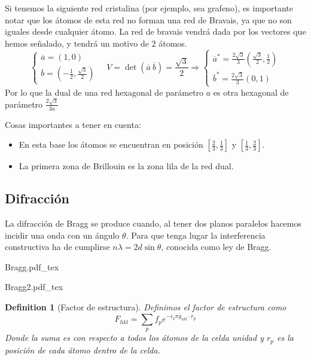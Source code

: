 \documentclass[leqno]{article}
\newtheorem*{definition}{Definition}
\newcommand{\incfig}[1]{%
\center
\def\svgwidth{0.9\columnwidth}
{#1.pdf_tex}
}
\begin{document}
Si tenemos la siguiente red cristalina (por ejemplo, sea grafeno), es importante notar que los átomos de esta red no forman una red de Bravais, ya que no son iguales desde cualquier átomo. La red de bravais vendrá dada por los vectores que hemos señalado, y tendrá un motivo de $2$ átomos.
\[
\begin{cases}
  \overline{a} = (1, 0)\\
  \overline{b} = (-\frac{1}{2}, \frac{\sqrt{3} }{2})
\end{cases} \quad V = \det(\overline{a}\ \overline{b}) = \frac{\sqrt{3} }{2} \Rightarrow 
\begin{cases}
  \overline{a}^* = \frac{2 \sqrt{3} }{3}(\frac{\sqrt{3} }{2}, \frac{1}{2}) \\
  \overline{b}^* = \frac{2 \sqrt{3} }{3}( 0, 1)
\end{cases}
\] 
Por lo que la dual de una red hexagonal de parámetro $a$ es otra hexagonal de parámetro $\frac{2 \sqrt{3}}{3a}$

Cosas importantes a tener en cuenta:
\begin{itemize}[topsep=-6pt, itemsep=0pt]
  \item En esta base los átomos se encuentran en posición $[\frac{2}{3}, \frac{1}{3}]$ y $[\frac{1}{3}, \frac{2}{3}]$.
  \item La primera zona de Brillouin es la zona lila de la red dual.
\end{itemize}

\subsection{Difracción}
La difracción de Bragg se produce cuando, al tener dos planos paralelos hacemos incidir una onda con un ángulo $\theta$. Para que tenga lugar la interferencia constructiva ha de cumplirse $n\lambda= 2d \sin\theta $, conocida como ley de Bragg.

\begin{minipage}{0.4\textwidth}
  \incfig{Bragg}
\end{minipage}
\begin{minipage}{0.6\textwidth}
  \incfig{Bragg2}
\end{minipage}

\begin{definition}[Factor de estructura] Definimos el factor de estructura como
  \[
  F_{hkl} = \sum_p f_p e^{-i_2\pi \overline{g}_{hkl}\cdot \overline{r}_p}
  \] 
  Donde la suma es con respecto a todos los átomos de la celda unidad y $r_p$ es la posición de cada átomo dentro de la celda.
\end{definition}
\end{document}
